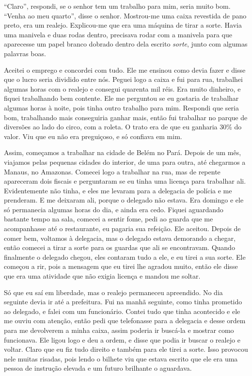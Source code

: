 ``Claro'', respondi, se o senhor tem um trabalho para mim, seria muito
bom. ``Venha ao meu quarto'', disse o senhor. Mostrou-me uma caixa
revestida de pano preto, era um realejo. Explicou-me que era uma máquina
de tirar a sorte. Havia uma manivela e duas rodas dentro, precisava 
rodar com a manivela para que aparecesse um papel branco dobrado dentro
dela escrito \textit{sorte}, junto com algumas palavras boas.

Aceitei o emprego e concordei com tudo. Ele me ensinou como devia fazer
e disse que o lucro seria dividido entre nós. Peguei logo a caixa e
fui para rua, trabalhei algumas horas com o realejo e consegui quarenta
mil réis. Era muito dinheiro, e fiquei trabalhando bem contente.
Ele me perguntou se eu gostaria de trabalhar algumas horas à noite, pois
tinha outro trabalho para mim. Respondi que seria bom, trabalhando mais
conseguiria ganhar mais, então fui trabalhar no parque de diversões ao
lado do circo, com a roleta. O trato era de que eu ganharia 30\% do valor. Viu que eu
não era preguiçoso, e só confiava em mim.

Assim, começamos a trabalhar na cidade de Belém no Pará. Depois de um
mês, viajamos pelas pequenas cidades do interior, de uma para
outra, até chegarmos a Manaus, no Amazonas. Comecei logo a trabalhar na
rua, mas de repente apareceram dois fiscais e perguntaram se eu tinha uma
licença para trabalhar ali. Evidentemente não tinha, e eles me
levaram para a delegacia de polícia e me prenderam. E me deixaram ali,
porque o delegado não estava. Era domingo e ele só permanecia algumas
horas do dia, e ainda era cedo. Fiquei aguardando bastante tempo na
sala, comecei a sentir fome, pedi ao guarda que me acompanhasse até o
restaurante, eu pagaria sua refeição. Ele aceitou. Depois de comer
bem, voltamos à delegacia, mas o delegado estava demorando a chegar,
então comecei a tirar a sorte para os guardas que ali se encontravam.
Quando finalmente o delegado chegou, eles contaram tudo a ele, e eu
tirei a sua sorte. Ele começou a rir, pois a mensagem que eu tirei lhe
agradou muito, então ele disse que era uma atividade que não exigia
licença e mandou me soltar.

Só que eu saí em liberdade, mas o realejo permaneceu apreendido. No dia
seguinte devia ir até a prefeitura. Fui na manhã seguinte, como tinha
prometido ao delegado, e falei com um funcionário. Contei tudo que tinha
acontecido e ele me ouviu com atenção, então pedi que telefonasse para a
delegacia e desse ordem para me devolverem a minha caixa, assim poderia
ir buscá-la e mostrar como funcionava. Ele ligou logo e deu a ordem, e
disse que podia ir buscar o realejo e voltar. Claro que eu fiz tudo
direito e também para ele tirei a sorte. Isso provocou nele muitas
risadas, pois lendo o bilhete viu que estava escrito que ele era uma
pessoa de instrução elevada e um futuro brilhante o aguardava.

